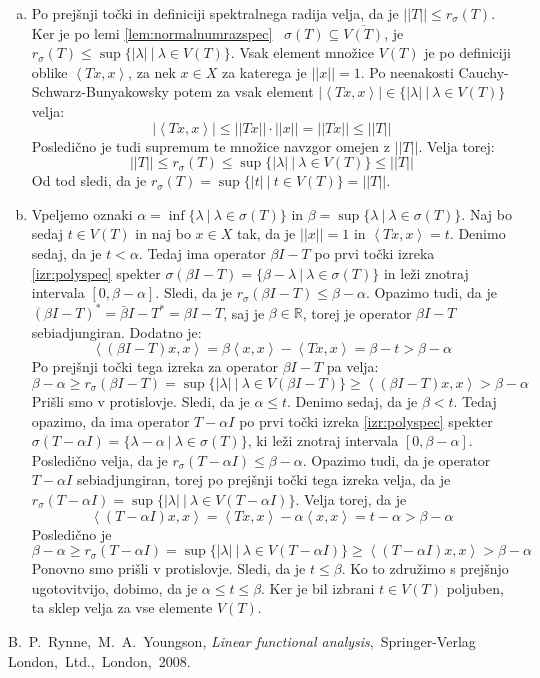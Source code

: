 \documentclass[mat2]{matdelo}
\newcommand{\R}{\mathbb{R}}
\newcommand{\abs}[1]{\ensuremath{\lvert #1 \rvert}}
\newcommand{\norm}[1]{\abs{\abs{#1}}}
\newcommand{\Sp}[2]{\ensuremath{\left<#1, #2\right>}}
\begin{document}
\begin{dokaz}
\begin{enumerate}[a)]
				\item Po prejšnji točki in definiciji spektralnega radija velja, da je $\norm{T}\leq r_\sigma(T)$. Ker je po lemi \ref{lem:normalnumrazspec} ~$\sigma(T) \subseteq \overline{V(T)}$, je $r_\sigma(T) \leq \sup\{\abs{\lambda}~|~\lambda\in V(T)\}$. Vsak element množice $V(T)$ je po definiciji oblike $\Sp{Tx}{x}$, za nek $x\in X$ za katerega je $\norm{x}=1$. Po neenakosti Cauchy-Schwarz-Bunyakowsky potem za vsak element $\abs{\Sp{Tx}{x}}\in \{\abs{\lambda}~|~\lambda\in V(T)\}$ velja: $$\abs{\Sp{Tx}{x}}\leq \norm{Tx}\cdot\norm{x} = \norm{Tx}\leq \norm{T}$$ Posledično je tudi supremum te množice navzgor omejen z $\norm{T}$. Velja torej: $$\norm{T} \leq r_\sigma(T) \leq \sup\{\abs{\lambda}~|~\lambda\in V(T)\} \leq \norm{T}$$ Od tod sledi, da je $r_\sigma(T)=\sup\{\abs{t}~|~t\in V(T)\} = \norm{T}$.
				\item Vpeljemo oznaki $\alpha=\inf\{\lambda~|~\lambda\in\sigma(T)\}$ in $\beta=\sup\{\lambda~|~ \lambda\in\sigma(T)\}$. Naj bo sedaj $t\in V(T)$ in naj bo $x\in X$ tak, da je $\norm{x}=1$ in $\Sp{Tx}{x}=t$. Denimo sedaj, da je $t < \alpha$. Tedaj ima operator $\beta I - T$ po prvi točki izreka \ref{izr:polyspec} spekter $\sigma(\beta I - T)=\{\beta - \lambda~|~\lambda\in\sigma(T)\}$ in leži znotraj intervala $[0, \beta - \alpha]$. Sledi, da je $r_\sigma(\beta I - T) \leq \beta - \alpha$. Opazimo tudi, da je $(\beta I - T)^* = \bar{\beta}I - T^* = \beta I - T$, saj je $\beta\in\R$, torej je operator $\beta I - T$ sebiadjungiran. Dodatno je: $$\Sp{(\beta I - T)x}{x} = \beta\Sp{x}{x} - \Sp{Tx}{x} = \beta - t > \beta - \alpha$$ Po prejšnji točki tega izreka za operator $\beta I - T$ pa velja: $$\beta - \alpha \geq r_\sigma(\beta I - T) = \sup\{\abs{\lambda}~|~\lambda\in V(\beta I - T)\}\geq\Sp{(\beta I - T)x}{x}>\beta - \alpha$$ Prišli smo v protislovje. Sledi, da je $\alpha \leq t$.
				Denimo sedaj, da je $\beta < t$. Tedaj opazimo, da ima operator $T - \alpha I$ po prvi točki izreka \ref{izr:polyspec} spekter $\sigma(T - \alpha I)=\{\lambda - \alpha~|~ \lambda \in \sigma(T)\}$, ki leži znotraj intervala $[0, \beta - \alpha]$. Posledično velja, da je $r_\sigma(T - \alpha I)\leq \beta - \alpha$. Opazimo tudi, da je operator $T - \alpha I$ sebiadjungiran, torej po prejšnji točki tega izreka velja, da je $r_\sigma(T - \alpha I) = \sup\{\abs{\lambda}~|~\lambda\in V(T - \alpha I)\}$. Velja torej, da je $$\Sp{(T - \alpha I)x}{x} = \Sp{Tx}{x} - \alpha\Sp{x}{x} = t - \alpha > \beta - \alpha$$
				Posledično je $$\beta - \alpha \geq r_\sigma(T - \alpha I) =\sup\{\abs{\lambda}~|~\lambda\in V(T - \alpha I)\}\geq \Sp{(T - \alpha I)x}{x} > \beta - \alpha$$
				Ponovno smo prišli v protislovje. Sledi, da je $t \leq \beta$. Ko to združimo s prejšnjo ugotovitvijo, dobimo, da je $\alpha \leq t \leq \beta$. Ker je bil izbrani $t\in V(T)$ poljuben, ta sklep velja za vse elemente $V(T)$.
			\end{enumerate}
		\end{dokaz}
		
	\begin{thebibliography}{99}
		 B.~P.~Rynne,~M.~A.~Youngson, \emph{Linear functional analysis},~Springer-Verlag London,~Ltd.,~London,~2008.
	\end{thebibliography}
	
\end{document}
